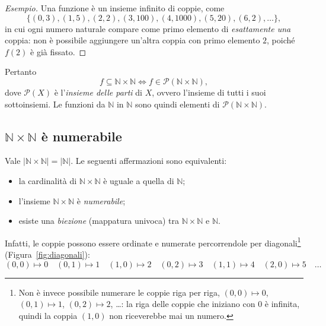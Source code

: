 \documentclass[a4paper, 11pt, oneside]{book}
\theoremstyle{formale}
\newenvironment{esempio}
    {\begin{proof}[\textit{Esempio}]\renewcommand{\qedsymbol}{$\diamond$}}
    {\end{proof}}
\begin{document}
    \begin{esempio}
        Una funzione \`e un insieme infinito di coppie, come
        \begin{equation*}
            \{(0, 3), (1, 5), (2, 2), (3, 100), (4, 1000), (5, 20), (6, 2), \dots\},
        \end{equation*}
        in cui ogni numero naturale compare come primo elemento di \emph{esattamente una}
        coppia: non \`e possibile aggiungere un'altra coppia con primo elemento $2$,
        poich\'e $f(2)$ \`e gi\`a fissato.
    \end{esempio}

    Pertanto
    \begin{equation*}
        f \subseteq \mathbb{N} \times \mathbb{N}
        \iff
        f \in \mathcal{P}(\mathbb{N} \times \mathbb{N}),
    \end{equation*}
    dove $\mathcal{P}(X)$ \`e l'\emph{insieme delle parti} di $X$, ovvero l'insieme di tutti
    i suoi sottoinsiemi. Le funzioni da $\mathbb{N}$ in $\mathbb{N}$ sono quindi elementi di
    $\mathcal{P}(\mathbb{N} \times \mathbb{N})$.

    \subsection{\texorpdfstring{$\mathbb{N} \times \mathbb{N}$}{N x N} \`e numerabile}
    Vale $|\mathbb{N} \times \mathbb{N}| = |\mathbb{N}|$. Le seguenti affermazioni sono
    equivalenti:
    \begin{itemize}
        \item la cardinalit\`a di $\mathbb{N} \times \mathbb{N}$ \`e uguale a quella di
            $\mathbb{N}$;
        \item l'insieme $\mathbb{N} \times \mathbb{N}$ \`e \emph{numerabile};
        \item esiste una \emph{biezione} (mappatura univoca) tra
            $\mathbb{N} \times \mathbb{N}$ e $\mathbb{N}$.
    \end{itemize}
    Infatti, le coppie possono essere ordinate e numerate percorrendole per
    diagonali\footnote{Non \`e invece possibile numerare le coppie riga per riga,
    $(0, 0) \mapsto 0$, $(0, 1) \mapsto 1$, $(0, 2) \mapsto 2$, \dots: la riga delle coppie
    che iniziano con $0$ \`e infinita, quindi la coppia $(1, 0)$ non riceverebbe mai un
    numero.} (Figura~\ref{fig:diagonali}):
    \begin{equation*}
        (0, 0) \mapsto 0 \quad
        (0, 1) \mapsto 1 \quad
        (1, 0) \mapsto 2 \quad
        (0, 2) \mapsto 3 \quad
        (1, 1) \mapsto 4 \quad
        (2, 0) \mapsto 5 \quad
        \dots
    \end{equation*}
\end{document}

